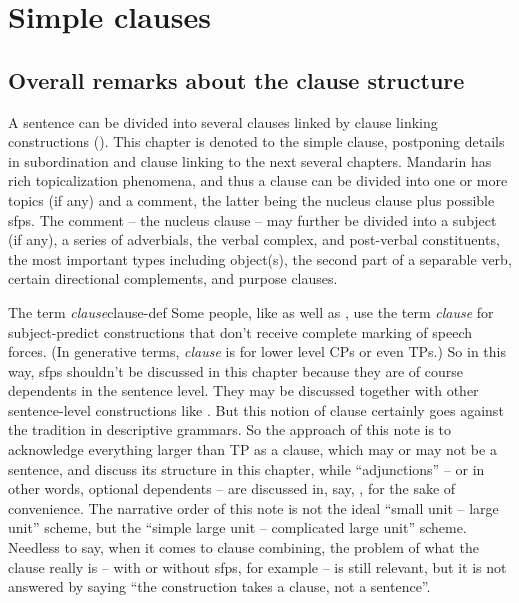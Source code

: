 \documentclass[UTF8, a4paper, oneside, scheme=plain]{ctexrep}
\newcommand*{\citepage}[1]{pp.~{#1}}
\newcommand*{\term}[1]{\emph{#1}}
\begin{document}
\chapter{Simple clauses}

\section{Overall remarks about the clause structure}

A sentence can be divided into several clauses linked by clause linking constructions 
().
This chapter is denoted to the simple clause,
postponing details in subordination and clause linking to the next several chapters.
Mandarin has rich topicalization phenomena,
and thus a clause can be divided into
one or more topics (if any) and a comment,
the latter being the nucleus clause
plus possible \acl{sfp}s.
The comment -- the nucleus clause -- may further be divided into a subject (if any),
a series of adverbials, 
the verbal complex, and post-verbal constituents,
the most important types including object(s), 
the second part of a separable verb,
certain directional complements,
and purpose clauses.

\begin{infobox}{The term \term{clause}}{clause-def}
    Some people, like \citet[\citepage{140}]{deng2010formal}
    as well as \citet{dixon2009basic},
    use the term \term{clause} for subject-predict constructions 
    that don't receive complete marking of speech forces.
    (In generative terms, \term{clause} is for lower level CPs or even TPs.)
    So in this way, \acl{sfp}s shouldn't be discussed in this chapter because 
    they are of course dependents in the sentence level.
    They may be discussed together with other sentence-level constructions like .
    But this notion of clause certainly goes against the tradition in descriptive grammars.
    So the approach of this note is to acknowledge everything larger than TP as a clause,
    which may or may not be a sentence,
    and discuss its structure in this chapter,
    while ``adjunctions'' -- or in other words, optional dependents -- 
    are discussed in, say, ,
    for the sake of convenience.
    The narrative order of this note is not the ideal ``small unit -- large unit'' scheme,
    but the ``simple large unit -- complicated large unit'' scheme.
    Needless to say,
    when it comes to clause combining, 
    the problem of what the clause really is -- with or without \ac{sfp}s, for example --
    is still relevant,
    but it is not answered by saying ``the construction takes a clause, not a sentence''.
\end{infobox}
\end{document}
